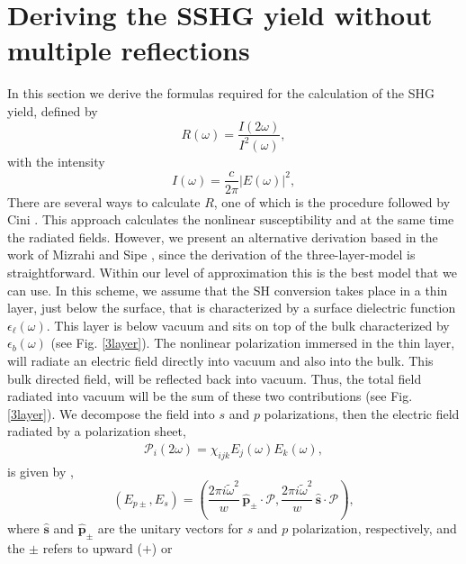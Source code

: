 \chapter{Deriving the SSHG yield without multiple reflections}
\label{app:shgyieldnomr}

In this section we derive the formulas required for the calculation of the SHG
yield, defined by
\begin{equation*}\label{uno}
R(\omega)=\frac{I(2\omega)}{I^2(\omega)}
,
\end{equation*}
with the intensity
\begin{equation*}\label{dos}
I(\omega)=\frac{c}{2\pi}|E(\omega)|^2
,
\end{equation*}
There are several ways to calculate $R$, one of which is the procedure followed
by Cini \cite{ciniPRB91}. This approach calculates the nonlinear susceptibility
and at the same time the radiated fields. However, we present an alternative
derivation based in the work of Mizrahi and Sipe \cite{mizrahiJOSA88}, since
the derivation of the three-layer-model is straightforward. Within our level of
approximation this is the best model that we can use. In this scheme, we assume
that the SH conversion takes place in a thin layer, just below the surface,
that is characterized by a surface dielectric function
$\epsilon_{\ell}(\omega)$. This layer is below vacuum and sits on top of the
bulk characterized by $\epsilon_{b}(\omega)$ (see Fig. \ref{3layer}). The
nonlinear polarization immersed in the thin layer, will radiate an electric
field directly into vacuum and also into the bulk. This bulk directed field,
will be reflected back into vacuum. Thus, the total field radiated into vacuum
will be the sum of these two contributions (see Fig. \ref{3layer}). We
decompose the field into $s$ and $p$ polarizations, then the electric field
radiated by a polarization sheet,
\begin{align}\label{tres}
\mathcal{P}_i(2\omega)=\chi_{ijk}E_{j}(\omega)E_{k}(\omega)
,
\end{align}
is given by \cite{mizrahiJOSA88},
\begin{equation*}\label{r2}
(E_{p\pm},E_s) = 
(\frac{2\pi i\tilde{\omega}^2}{w}
\,\hat{\mathbf{p}}_\pm\cdot\boldsymbol{\mathcal{P}},
\frac{2\pi i\tilde{\omega}^2}{w}
\,\hat{\mathbf{s}}\cdot\boldsymbol{\mathcal{P}}),
\end{equation*}
where $\hat{\mathbf{s}}$ and $\hat{\mathbf{p}}_\pm$ are the unitary vectors for
$s$ and $p$ polarization, respectively, and the $\pm$ refers to upward ($+$) or

